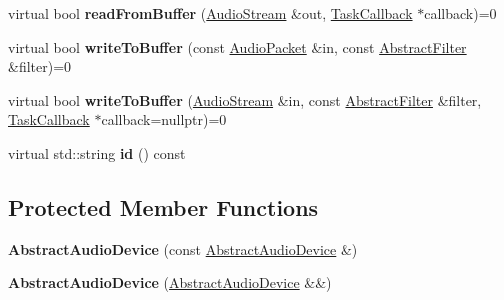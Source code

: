 \begin{DoxyCompactItemize}
\item 
\hypertarget{class_d_x_1_1_audio_1_1_abstract_audio_device_adde4b9a7286575f90258da492e0d8f9b}{virtual bool {\bfseries read\-From\-Buffer} (\hyperlink{class_d_x_1_1_lock_free_1_1_concurrent_stream}{Audio\-Stream} \&out, \hyperlink{class_d_x_1_1_audio_1_1_task_callback}{Task\-Callback} $\ast$callback)=0}\label{class_d_x_1_1_audio_1_1_abstract_audio_device_adde4b9a7286575f90258da492e0d8f9b}

\item 
\hypertarget{class_d_x_1_1_audio_1_1_abstract_audio_device_a08c33a0e97d3919024976b8e1ef19800}{virtual bool {\bfseries write\-To\-Buffer} (const \hyperlink{class_d_x_1_1_audio_1_1_audio_packet}{Audio\-Packet} \&in, const \hyperlink{struct_d_x_1_1_audio_1_1_abstract_filter}{Abstract\-Filter} \&filter)=0}\label{class_d_x_1_1_audio_1_1_abstract_audio_device_a08c33a0e97d3919024976b8e1ef19800}

\item 
\hypertarget{class_d_x_1_1_audio_1_1_abstract_audio_device_a0c79b32fdd2720a5bc759a6baa6edca3}{virtual bool {\bfseries write\-To\-Buffer} (\hyperlink{class_d_x_1_1_lock_free_1_1_concurrent_stream}{Audio\-Stream} \&in, const \hyperlink{struct_d_x_1_1_audio_1_1_abstract_filter}{Abstract\-Filter} \&filter, \hyperlink{class_d_x_1_1_audio_1_1_task_callback}{Task\-Callback} $\ast$callback=nullptr)=0}\label{class_d_x_1_1_audio_1_1_abstract_audio_device_a0c79b32fdd2720a5bc759a6baa6edca3}

\item 
\hypertarget{class_d_x_1_1_audio_1_1_abstract_audio_device_a300d1e3c5fcdf11dc99c82c41fdb03b9}{virtual std\-::string {\bfseries id} () const }\label{class_d_x_1_1_audio_1_1_abstract_audio_device_a300d1e3c5fcdf11dc99c82c41fdb03b9}

\end{DoxyCompactItemize}
\subsection*{Protected Member Functions}
\begin{DoxyCompactItemize}
\item 
\hypertarget{class_d_x_1_1_audio_1_1_abstract_audio_device_afe188c72c304c3ad1f7f77f779439c81}{{\bfseries Abstract\-Audio\-Device} (const \hyperlink{class_d_x_1_1_audio_1_1_abstract_audio_device}{Abstract\-Audio\-Device} \&)}\label{class_d_x_1_1_audio_1_1_abstract_audio_device_afe188c72c304c3ad1f7f77f779439c81}

\item 
\hypertarget{class_d_x_1_1_audio_1_1_abstract_audio_device_ab30ae887030ab1cf0facb2fa436d6e90}{{\bfseries Abstract\-Audio\-Device} (\hyperlink{class_d_x_1_1_audio_1_1_abstract_audio_device}{Abstract\-Audio\-Device} \&\&)}\label{class_d_x_1_1_audio_1_1_abstract_audio_device_ab30ae887030ab1cf0facb2fa436d6e90}

\end{DoxyCompactItemize}
